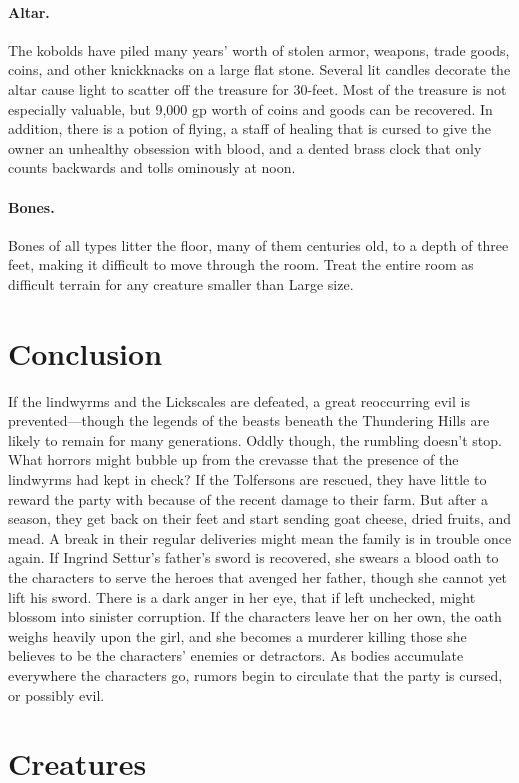\documentclass[10pt,a4paper,twoside,twocolumn,openany,bg=print,nodeprecatedcode]{dndbook}
\begin{document}
\paragraph{Altar.}
The kobolds have piled many years' worth of stolen armor, weapons, trade goods, coins, and other knickknacks on a large flat stone. Several lit candles decorate the altar cause light to scatter off the treasure for 30-feet. Most of the treasure is not especially valuable, but 9,000 gp worth of coins and goods can be recovered. In addition, there is a potion of flying, a staff of healing that is cursed to give the owner an unhealthy obsession with blood, and a dented brass clock that only counts backwards and tolls ominously at noon.
\paragraph{Bones.}
Bones of all types litter the floor, many of them centuries old, to a depth of three feet, making it difficult to move through the room. Treat the entire room as difficult terrain for any creature smaller than Large size.
\section{Conclusion}
If the lindwyrms and the Lickscales are defeated, a great reoccurring evil is prevented—though the legends of the beasts beneath the Thundering Hills are likely to remain for many generations. Oddly though, the rumbling doesn't stop. What horrors might bubble up from the crevasse that the presence of the lindwyrms had kept in check?
If the Tolfersons are rescued, they have little to reward the party with because of the recent damage to their farm. But after a season, they get back on their feet and start sending goat cheese, dried fruits, and mead. A break in their regular deliveries might mean the family is in trouble once again.
If Ingrind Settur's father's sword is recovered, she swears a blood oath to the characters to serve the heroes that avenged her father, though she cannot yet lift his sword. There is a dark anger in her eye, that if left unchecked, might blossom into sinister corruption. If the characters leave her on her own, the oath weighs heavily upon the girl, and she becomes a murderer killing those she believes to be the characters' enemies or detractors. As bodies accumulate everywhere the characters go, rumors begin to circulate that the party is cursed, or possibly evil.
\section{Creatures}
\end{document}

